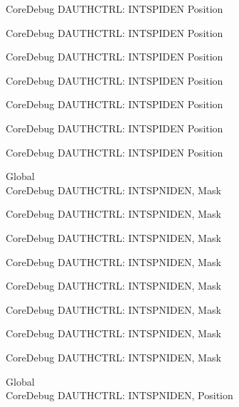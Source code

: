 \begin{DoxyRefList}
\label{deprecated__deprecated000143}%
%
Core\+Debug DAUTHCTRL\+: INTSPIDEN Position 

\label{deprecated__deprecated000219}%
%
Core\+Debug DAUTHCTRL\+: INTSPIDEN Position 

\label{deprecated__deprecated000282}%
%
Core\+Debug DAUTHCTRL\+: INTSPIDEN Position 

\label{deprecated__deprecated000361}%
%
Core\+Debug DAUTHCTRL\+: INTSPIDEN Position 

\label{deprecated__deprecated000437}%
%
Core\+Debug DAUTHCTRL\+: INTSPIDEN Position 

\label{deprecated__deprecated000540}%
%
Core\+Debug DAUTHCTRL\+: INTSPIDEN Position 

\label{deprecated__deprecated000642}%
%
Core\+Debug DAUTHCTRL\+: INTSPIDEN Position  
\item[Global \doxylink{group___c_m_s_i_s___s_c_b_gadad0bf68d32cba49c1ea7534122c2752}{Core\+Debug\+\_\+\+DAUTHCTRL\+\_\+\+INTSPNIDEN\+\_\+\+Msk} ]\hfill \\
\label{deprecated__deprecated000086}%
%
Core\+Debug DAUTHCTRL\+: INTSPNIDEN, Mask 

\label{deprecated__deprecated000140}%
%
Core\+Debug DAUTHCTRL\+: INTSPNIDEN, Mask 

\label{deprecated__deprecated000216}%
%
Core\+Debug DAUTHCTRL\+: INTSPNIDEN, Mask 

\label{deprecated__deprecated000279}%
%
Core\+Debug DAUTHCTRL\+: INTSPNIDEN, Mask 

\label{deprecated__deprecated000358}%
%
Core\+Debug DAUTHCTRL\+: INTSPNIDEN, Mask 

\label{deprecated__deprecated000434}%
%
Core\+Debug DAUTHCTRL\+: INTSPNIDEN, Mask 

\label{deprecated__deprecated000537}%
%
Core\+Debug DAUTHCTRL\+: INTSPNIDEN, Mask 

\label{deprecated__deprecated000639}%
%
Core\+Debug DAUTHCTRL\+: INTSPNIDEN, Mask  
\item[Global \doxylink{group___c_m_s_i_s___s_c_b_gaf733a36e6b4717a604f7d77c05dfceb4}{Core\+Debug\+\_\+\+DAUTHCTRL\+\_\+\+INTSPNIDEN\+\_\+\+Pos} ]\hfill \\
\label{deprecated__deprecated000085}%
%
Core\+Debug DAUTHCTRL\+: INTSPNIDEN, Position 


\end{DoxyRefList}
